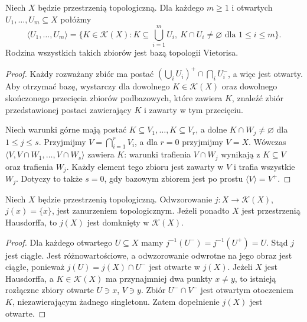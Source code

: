 \begin{stwierdzenie}
\label{prop:topog21-vietoris-basis}
Niech \(X\) będzie przestrzenią topologiczną.
Dla każdego \(m\ge1\) i otwartych \(U_1,\ldots,U_m\subseteq X\)
połóżmy
\[
 \langle U_1,\ldots,U_m\rangle
 =\{K\in\mathcal K(X):
 K\subseteq\textstyle\bigcup_{i=1}^{m}U_i,\
 K\cap U_i\neq\varnothing\text{ dla }1\le i\le m\}.
\]
Rodzina wszystkich takich zbiorów jest bazą
topologii Vietorisa.
\end{stwierdzenie}
\begin{proof}
Każdy rozważany zbiór ma postać
\((\bigcup_iU_i)^+\cap\bigcap_iU_i^-\),
a więc jest otwarty.
Aby otrzymać bazę, wystarczy dla dowolnego
\(K\in\mathcal K(X)\) oraz dowolnego
skończonego przecięcia zbiorów podbazowych,
które zawiera \(K\), znaleźć zbiór przedstawionej
postaci zawierający \(K\) i zawarty w tym przecięciu.

Niech warunki górne mają postać
\(K\subseteq V_1,\ldots,K\subseteq V_r\),
a dolne \(K\cap W_j\neq\varnothing\) dla \(1\le j\le s\).
Przyjmijmy \(V=\bigcap_{i=1}^{r}V_i\),
a dla \(r=0\) przyjmijmy \(V=X\).
Wówczas
\(\langle V,V\cap W_1,\ldots,V\cap W_s\rangle\)
zawiera \(K\): warunki trafienia \(V\cap W_j\)
wynikają z \(K\subseteq V\) oraz trafienia \(W_j\).
Każdy element tego zbioru jest zawarty w \(V\)
i trafia wszystkie \(W_j\).
Dotyczy to także \(s=0\), gdy bazowym zbiorem
jest po prostu \(\langle V\rangle=V^+\).
\end{proof}

\begin{stwierdzenie}
\label{prop:topog21-singletons}
Niech \(X\) będzie przestrzenią topologiczną.
Odwzorowanie
\(j\colon X\to\mathcal K(X)\), \(j(x)=\{x\}\),
jest zanurzeniem topologicznym.
Jeżeli ponadto \(X\) jest przestrzenią Hausdorffa,
to \(j(X)\) jest domknięty w \(\mathcal K(X)\).
\end{stwierdzenie}
\begin{proof}
Dla każdego otwartego \(U\subseteq X\) mamy
\(j^{-1}(U^-)=j^{-1}(U^+)=U\).
Stąd \(j\) jest ciągłe.
Jest różnowartościowe, a odwzorowanie odwrotne
na jego obraz jest ciągłe, ponieważ
\(j(U)=j(X)\cap U^-\) jest otwarte w \(j(X)\).
Jeżeli \(X\) jest Hausdorffa, a \(K\in\mathcal K(X)\)
ma przynajmniej dwa punkty \(x\neq y\), to istnieją
rozłączne zbiory otwarte \(U\ni x\), \(V\ni y\).
Zbiór \(U^-\cap V^-\) jest otwartym otoczeniem \(K\),
niezawierającym żadnego singletonu.
Zatem dopełnienie \(j(X)\) jest otwarte.
\end{proof}

